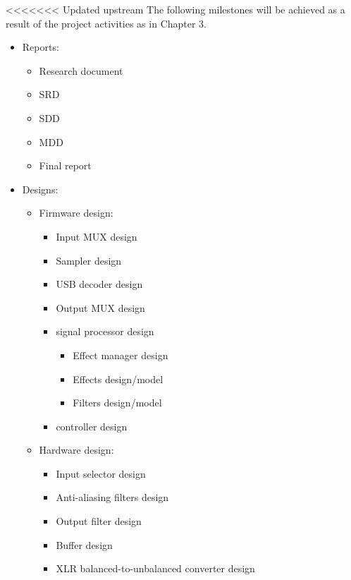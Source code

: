 <<<<<<< Updated upstream
The following milestones will be achieved as a result of the project activities as in Chapter 3.
\begin{itemize}
    \setlength\itemsep{-0.2em}
    \item Reports:
    \begin{itemize}
        \setlength\itemsep{-0.2em}
        \item Research document
        \item SRD
        \item SDD
        \item MDD
        \item Final report
    \end{itemize}
    \item Designs:
    \begin{itemize}
        \setlength\itemsep{-0.2em}
        \item Firmware design:
        \begin{itemize}
            \setlength\itemsep{-0.2em}
            \item Input MUX design
            \item Sampler design
            \item USB decoder design
            \item Output MUX design
            \item signal processor design
            \begin{itemize}
                \setlength\itemsep{-0.2em}
                \item Effect manager design
                \item Effects design/model
                \item Filters design/model
            \end{itemize}
            \item controller design
        \end{itemize}
        \item Hardware design:
        \begin{itemize}
            \setlength\itemsep{-0.2em}
            \item Input selector design
            \item Anti-aliasing filters design
            \item Output filter design
            \item Buffer design
            \item XLR balanced-to-unbalanced converter design

\end{itemize}
\end{itemize}
\end{itemize}
